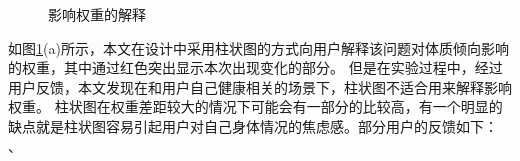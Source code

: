 \begin{figure}[htbp]
    \centering
    \caption{影响权重的解释}
    \label{fig:question_weight}
\end{figure}

如图\ref{fig:question_weight}(a)所示，本文在设计中采用柱状图的方式向用户解释该问题对体质倾向影响的权重，其中通过红色突出显示本次出现变化的部分。
但是在实验过程中，经过用户反馈，本文发现在和用户自己健康相关的场景下，柱状图不适合用来解释影响权重。
柱状图在权重差距较大的情况下可能会有一部分的比较高，有一个明显的缺点就是柱状图容易引起用户对自己身体情况的焦虑感。部分用户的反馈如下：
、

